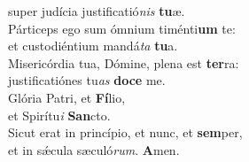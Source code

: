 \evenverse super judícia justificatió\textit{nis} \textbf{tu}æ.\\
\oddverse Párticeps ego sum ómnium timénti\textbf{um} te:~\*\\
\oddverse et custodiéntium mandá\textit{ta} \textbf{tu}a.\\
\evenverse Misericórdia tua, Dómine, plena est \textbf{ter}ra:~\*\\
\evenverse justificatiónes tu\textit{as} \textbf{do}\textbf{ce} me.\\
\oddverse Glória Patri, et \textbf{Fí}lio,~\*\\
\oddverse et Spirítu\textit{i} \textbf{San}cto.\\
\evenverse Sicut erat in princípio, et nunc, et \textbf{sem}per,~\*\\
\evenverse et in sǽcula sæculó\textit{rum}. \textbf{A}men.\\
